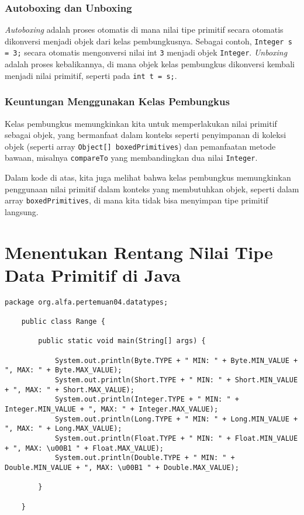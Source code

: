 \subsubsection{Autoboxing dan Unboxing}
\textit{Autoboxing} adalah proses otomatis di mana nilai tipe primitif secara otomatis dikonversi menjadi objek dari kelas pembungkusnya. Sebagai contoh, \texttt{Integer s = 3;} secara otomatis mengonversi nilai int \texttt{3} menjadi objek \texttt{Integer}. \textit{Unboxing} adalah proses kebalikannya, di mana objek kelas pembungkus dikonversi kembali menjadi nilai primitif, seperti pada \texttt{int t = s;}.

\subsubsection{Keuntungan Menggunakan Kelas Pembungkus}
Kelas pembungkus memungkinkan kita untuk memperlakukan nilai primitif sebagai objek, yang bermanfaat dalam konteks seperti penyimpanan di koleksi objek (seperti array \texttt{Object[] boxedPrimitives}) dan pemanfaatan metode bawaan, misalnya \texttt{compareTo} yang membandingkan dua nilai \texttt{Integer}.

Dalam kode di atas, kita juga melihat bahwa kelas pembungkus memungkinkan penggunaan nilai primitif dalam konteks yang membutuhkan objek, seperti dalam array \texttt{boxedPrimitives}, di mana kita tidak bisa menyimpan tipe primitif langsung.

\section{Menentukan Rentang Nilai Tipe Data Primitif di Java}

\begin{lstlisting}[style=JavaStyle, caption={Java Code for Displaying Range of Primitive Data Types}]
	package org.alfa.pertemuan04.datatypes;
	
	public class Range {
		
		public static void main(String[] args) {
			
			System.out.println(Byte.TYPE + " MIN: " + Byte.MIN_VALUE + ", MAX: " + Byte.MAX_VALUE);
			System.out.println(Short.TYPE + " MIN: " + Short.MIN_VALUE + ", MAX: " + Short.MAX_VALUE);
			System.out.println(Integer.TYPE + " MIN: " + Integer.MIN_VALUE + ", MAX: " + Integer.MAX_VALUE);
			System.out.println(Long.TYPE + " MIN: " + Long.MIN_VALUE + ", MAX: " + Long.MAX_VALUE);
			System.out.println(Float.TYPE + " MIN: " + Float.MIN_VALUE + ", MAX: \u00B1 " + Float.MAX_VALUE);
			System.out.println(Double.TYPE + " MIN: " + Double.MIN_VALUE + ", MAX: \u00B1 " + Double.MAX_VALUE);
			
		}
		
	}
\end{lstlisting}

